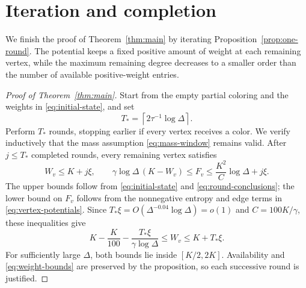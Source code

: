 \section{Iteration and completion}\label{sec:completion}

We finish the proof of Theorem~\ref{thm:main} by iterating
Proposition~\ref{prop:one-round}.  The potential keeps a fixed positive
amount of weight at each remaining vertex, while the maximum remaining
degree decreases to a smaller order than the number of available
positive-weight entries.

\begin{proof}[Proof of Theorem~\ref{thm:main}]
Start from the empty partial coloring and the weights in
\eqref{eq:initial-state}, and set
\begin{equation}\label{eq:number-of-rounds}
 T_* = \left\lceil2\tau^{-1}\log\Delta\right\rceil.
\end{equation}
Perform $T_*$ rounds, stopping earlier if every vertex receives a
color.  We verify inductively that the mass assumption
\eqref{eq:mass-window} remains valid.  After $j\le T_*$ completed
rounds, every remaining vertex satisfies
\begin{equation}\label{eq:iteration-potentials}
 W_v\le K+j\xi,\qquad
 \gamma\log\Delta\,(K-W_v)\le F_v
 \le\frac{K^2}{C}\log\Delta+j\xi.
\end{equation}
The upper bounds follow from \eqref{eq:initial-state} and
\eqref{eq:round-conclusions}; the lower bound on $F_v$ follows from
the nonnegative entropy and edge terms in
\eqref{eq:vertex-potentials}.  Since
$T_*\xi=O(\Delta^{-0.04}\log\Delta)=o(1)$ and
$C=100K/\gamma$, these inequalities give
\begin{equation}\label{eq:iteration-mass-window}
 K-\frac K{100}-\frac{T_*\xi}{\gamma\log\Delta}
 \le W_v\le K+T_*\xi.
\end{equation}
For sufficiently large $\Delta$, both bounds lie inside $[K/2,2K]$.
Availability and \eqref{eq:weight-bounds} are preserved by the
proposition, so each successive round is justified.


\end{proof}
